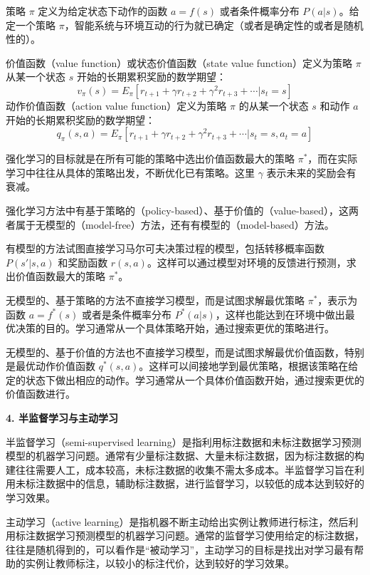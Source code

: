 \documentclass[UTF8,12pt,a4paper,fontset=fandol]{ctexart}
\begin{document}
策略 $\pi$ 定义为给定状态下动作的函数 $a=f(s)$ 或者条件概率分布 $P(a|s)$。给定一个策略 $\pi$，智能系统与环境互动的行为就已确定（或者是确定性的或者是随机性的）。

价值函数（value function）或状态价值函数（state value function）定义为策略 $\pi$ 从某一个状态 $s$ 开始的长期累积奖励的数学期望：
\begin{equation}
  v_\pi(s)=E_\pi[r_{t+1}+\gamma r_{t+2}+\gamma^2 r_{t+3}+\cdots|s_t=s]
  \tag{1.1}
\end{equation}
动作价值函数（action value function）定义为策略 $\pi$ 的从某一个状态 $s$ 和动作 $a$ 开始的长期累积奖励的数学期望：
\begin{equation}
  q_\pi(s,a)=E_\pi[r_{t+1}+\gamma r_{t+2}+\gamma^2 r_{t+3}+\cdots|s_t=s,a_t=a]
  \tag{1.2}
\end{equation}

强化学习的目标就是在所有可能的策略中选出价值函数最大的策略 $\pi^*$，而在实际学习中往往从具体的策略出发，不断优化已有策略。这里 $\gamma$ 表示未来的奖励会有衰减。

强化学习方法中有基于策略的（policy-based）、基于价值的（value-based），这两者属于无模型的（model-free）方法，还有有模型的（model-based）方法。

有模型的方法试图直接学习马尔可夫决策过程的模型，包括转移概率函数 $P(s'|s,a)$ 和奖励函数 $r(s,a)$。这样可以通过模型对环境的反馈进行预测，求出价值函数最大的策略 $\pi^*$。

无模型的、基于策略的方法不直接学习模型，而是试图求解最优策略 $\pi^*$，表示为函数 $a=f^*(s)$ 或者是条件概率分布 $P^*(a|s)$，这样也能达到在环境中做出最优决策的目的。学习通常从一个具体策略开始，通过搜索更优的策略进行。

无模型的、基于价值的方法也不直接学习模型，而是试图求解最优价值函数，特别是最优动作价值函数 $q^*(s,a)$。这样可以间接地学到最优策略，根据该策略在给定的状态下做出相应的动作。学习通常从一个具体价值函数开始，通过搜索更优的价值函数进行。

\noindent\textbf{4. 半监督学习与主动学习}

半监督学习（semi-supervised learning）是指利用标注数据和未标注数据学习预测模型的机器学习问题。通常有少量标注数据、大量未标注数据，因为标注数据的构建往往需要人工，成本较高，未标注数据的收集不需太多成本。半监督学习旨在利用未标注数据中的信息，辅助标注数据，进行监督学习，以较低的成本达到较好的学习效果。

主动学习（active learning）是指机器不断主动给出实例让教师进行标注，然后利用标注数据学习预测模型的机器学习问题。通常的监督学习使用给定的标注数据，往往是随机得到的，可以看作是“被动学习”，主动学习的目标是找出对学习最有帮助的实例让教师标注，以较小的标注代价，达到较好的学习效果。
\end{document}
